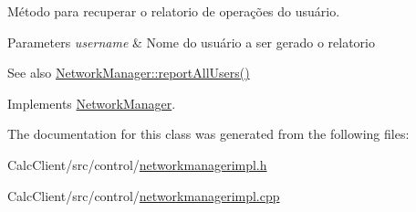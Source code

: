 Método para recuperar o relatorio de operações do usuário. 


\begin{DoxyParams}{Parameters}
{\em username} & Nome do usuário a ser gerado o relatorio \\
\hline
\end{DoxyParams}
\begin{DoxySeeAlso}{See also}
\hyperlink{classNetworkManager_a8c788f00be9ce6736cf3a1deac0b0906}{Network\+Manager\+::report\+All\+Users()} 
\end{DoxySeeAlso}


Implements \hyperlink{classNetworkManager_a1d37ebe528cb047d40bbacd950e0ef83}{Network\+Manager}.



The documentation for this class was generated from the following files\+:\begin{DoxyCompactItemize}
\item 
Calc\+Client/src/control/\hyperlink{networkmanagerimpl_8h}{networkmanagerimpl.\+h}\item 
Calc\+Client/src/control/\hyperlink{networkmanagerimpl_8cpp}{networkmanagerimpl.\+cpp}\end{DoxyCompactItemize}
